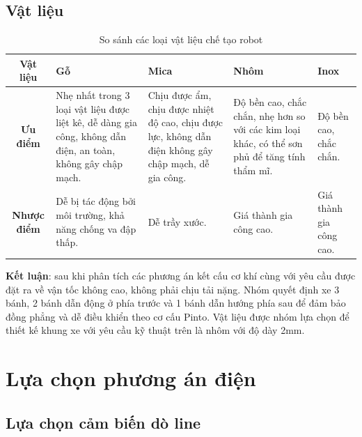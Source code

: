         \subsection{Vật liệu}
            \begin{table}[H]
                \centering
                \caption{So sánh các loại vật liệu chế tạo robot}
                \begin{tabular}{|c|p{2.8cm}|p{2.8cm}|p{2.8cm}|p{2.8cm}|}
                    \hline
                    \textbf{Vật liệu} & \textbf{Gỗ} & \textbf{Mica} & \textbf{Nhôm} & \textbf{Inox} \\
                    \hline
                    \textbf{Ưu điểm} 
                    & Nhẹ nhất trong 3 loại vật liệu được liệt kê, dễ dàng gia công, không dẫn điện, an toàn, không gây chập mạch.  
                    & Chịu được ẩm, chịu được nhiệt độ cao, chịu được lực, không dẫn điện không gây chập mạch, dễ gia công.
                    & Độ bền cao, chắc chắn, nhẹ hơn so với các kim loại khác, có thể sơn phủ để tăng tính thẩm mĩ.
                    & Độ bền cao, chắc chắn. \\
                    \hline
                    \textbf{Nhược điểm} 
                    & Dễ bị tác động bởi môi trường, khả năng chống va đập thấp.
                    & Dễ trầy xước.
                    & Giá thành gia công cao.
                    & Giá thành gia công cao. \\
                    \hline
                \end{tabular} 
                \label{tab:label}
            \end{table}
        \hspace*{0.6cm}\textbf{Kết luận}: sau khi phân tích các phương án kết cấu cơ khí cùng với yêu cầu được đặt ra về vận tốc không cao, không phải chịu tải nặng. Nhóm quyết định xe 3 bánh, 2 bánh dẫn động ở phía trước và 1 bánh dẫn hướng phía sau để đảm bảo đồng phẳng và dễ điều khiển theo cơ cấu Pinto. Vật liệu được nhóm lựa chọn để thiết kế khung xe với yêu cầu kỹ thuật trên là nhôm với độ dày 2mm. 
    \section{Lựa chọn phương án điện}
        \subsection{Lựa chọn cảm biến dò line}
